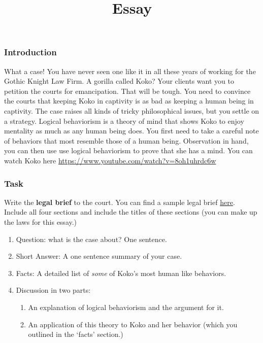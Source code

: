 \documentclass[]{article}
\title{Essay}
\date{}
\begin{document}

\subsubsection{Introduction}\label{introduction}

What a case! You have never seen one like it in all these years of
working for the Gothic Knight Law Firm. A gorilla called Koko? Your
clients want you to petition the courts for emancipation. That will be
tough. You need to convince the courts that keeping Koko in captivity is
as bad as keeping a human being in captivity. The case raises all kinds
of tricky philosophical issues, but you settle on a strategy. Logical
behaviorism is a theory of mind that shows Koko to enjoy mentality as
much as any human being does. You first need to take a careful note of
behaviors that most resemble those of a human being. Observation in
hand, you can then use use logical behaviorism to prove that she has a
mind. You can watch Koko here
\url{https://www.youtube.com/watch?v=8oh1uhrdc6w}



\subsubsection{Task}\label{task}

Write the \textbf{legal brief} to the court. You can find a sample legal
brief
\href{http://www.law.cuny.edu/legal-writing/students/memorandum/memorandum-3.html}{here}.
Include all four sections and include the titles of these sections (you
can make up the laws for this essay.)

\begin{enumerate}
\def\labelenumi{\arabic{enumi}.}
\itemsep1pt\parskip0pt
\item
  Question: what is the case about? One sentence.
\item
  Short Answer: A one sentence summary of your case.
\item
  Facts: A detailed list of \emph{some} of Koko's most human like
  behaviors. 
\item
  Discussion in two parts:

  \begin{enumerate}
  \def\labelenumii{\arabic{enumii}.}
  \itemsep1pt\parskip0pt
  \item
    An explanation of logical behaviorism and the argument for it.
  \item
    An application of this theory to Koko and her behavior (which you
    outlined in the `facts' section.)
  \end{enumerate}
\end{enumerate}
\end{document}

